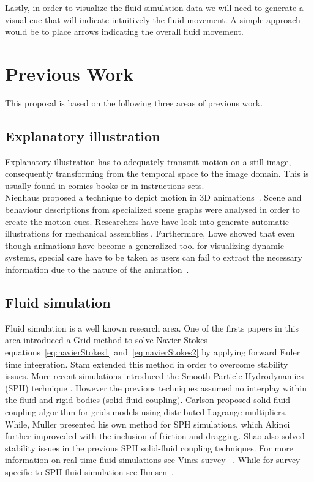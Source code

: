\documentclass[11pt]{report}
\begin{document}
Lastly, in order to visualize the fluid simulation data we will need to generate a visual cue that will indicate intuitively the fluid movement.
A simple approach would be to place arrows indicating the overall fluid movement.

\section{Previous Work}

This proposal is based on the following three areas of previous work.

\subsection{Explanatory illustration}

Explanatory illustration has to adequately transmit motion on a still image, consequently transforming from the temporal space to the image domain.
This is usually found in comics books or in instructions sets.\\

Nienhaus proposed a technique to depict motion in 3D animations~\cite{Nienhaus2005}.
Scene and behaviour descriptions from specialized scene graphs were analysed in order to create the motion cues.  
Researchers have have look into generate automatic illustrations for mechanical assemblies \cite{Mitra2010}.
Furthermore, Lowe showed that even though animations have become a generalized tool for visualizing dynamic systems, special care have to be taken as users can fail to extract the necessary information due to the nature of the animation~\cite{Lowe2014}.


\subsection{Fluid simulation}
\label{prevWorkFluidSim}

Fluid simulation is a well known research area. 
One of the firsts papers in this area introduced a Grid method \cite{Foster1996} to solve Navier-Stokes equations~\ref{eq:navierStokes1} and~\ref{eq:navierStokes2} by applying forward Euler time integration. 
Stam \cite{Stam1999} extended this method in order to overcome stability issues.
More recent simulations introduced the Smooth Particle Hydrodynamics (SPH) technique \cite{DesbrunMathieuandGascuel1996}.
However the previous techniques assumed no interplay within the fluid and rigid bodies (solid-fluid coupling).
Carlson \cite{Carlson2004} proposed solid-fluid coupling algorithm for grids models using distributed Lagrange multipliers.
While, Muller \cite{Muller2004} presented his own method for SPH simulations, which Akinci \cite{Akinci2012} further improveded with the inclusion of friction and dragging. 
Shao \cite{Shao2014} also solved stability issues in the previous SPH solid-fluid coupling techniques.
For more information on real time fluid simulations see Vines survey ~\cite{Vines2012}.
While for survey specific to SPH fluid simulation see Ihmsen~\cite{Ihmsen2014}.
\end{document}
